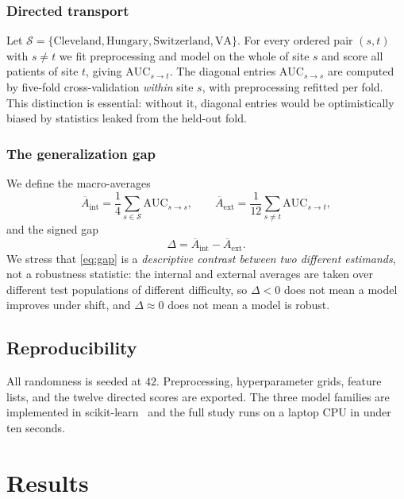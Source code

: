 \documentclass[manuscript,nonacm]{acmart}
\begin{document}
\subsubsection{Directed transport}
Let $\mathcal{S}=\{\text{Cleveland},\text{Hungary},\text{Switzerland},\text{VA}\}$. For
every ordered pair $(s,t)$ with $s\ne t$ we fit preprocessing and model on the whole of
site $s$ and score all patients of site $t$, giving $\mathrm{AUC}_{s\rightarrow t}$. The
diagonal entries $\mathrm{AUC}_{s\rightarrow s}$ are computed by five-fold
cross-validation \emph{within} site $s$, with preprocessing refitted per fold. This
distinction is essential: without it, diagonal entries would be optimistically biased by
statistics leaked from the held-out fold.

\subsubsection{The generalization gap}
We define the macro-averages
\begin{equation}
\overline{A}_{\text{int}}=\frac{1}{4}\sum_{s\in\mathcal{S}}\mathrm{AUC}_{s\rightarrow s},
\qquad
\overline{A}_{\text{ext}}=\frac{1}{12}\sum_{s\ne t}\mathrm{AUC}_{s\rightarrow t},
\label{eq:macro}
\end{equation}
and the signed gap
\begin{equation}
\Delta=\overline{A}_{\text{int}}-\overline{A}_{\text{ext}} .
\label{eq:gap}
\end{equation}
We stress that \cref{eq:gap} is a \emph{descriptive contrast between two different
estimands}, not a robustness statistic: the internal and external averages are taken
over different test populations of different difficulty, so $\Delta<0$ does not mean a
model improves under shift, and $\Delta\approx0$ does not mean a model is robust.

\subsection{Reproducibility}
All randomness is seeded at $42$. Preprocessing, hyperparameter grids, feature lists,
and the twelve directed scores are exported. The three model families are implemented in
scikit-learn~\cite{pedregosa2011} and the full study runs on a laptop CPU in under ten
seconds.

\section{Results}
\end{document}
